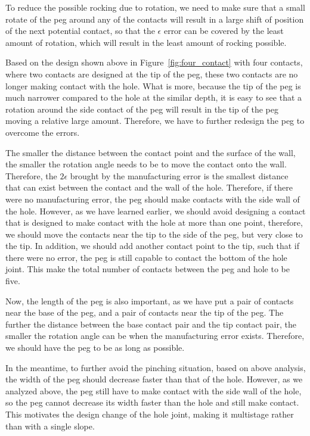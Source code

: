 \documentclass[11pt, twocolumn]{article}
\begin{document}
To reduce the possible rocking due to rotation, we need to make sure that a small rotate of the peg around any of the contacts will result in a large shift of position of the next potential contact, so that the $\epsilon$ error can be covered by the least amount of rotation, which will result in the least amount of rocking possible. 

Based on the design shown above in Figure~\ref{fig:four_contact} with four contacts, where two contacts are designed at the tip of the peg, these two contacts are no longer making contact with the hole. What is more, because the tip of the peg is much narrower compared to the hole at the similar depth, it is easy to see that a rotation around the side contact of the peg will result in the tip of the peg moving a relative large amount. Therefore, we have to further redesign the peg to overcome the errors. 


The smaller the distance between the contact point and the surface of the wall, the smaller the rotation angle needs to be to move the contact onto the wall. Therefore, the $2\epsilon$ brought by the manufacturing error is the smallest distance that can exist between the contact and the wall of the hole. Therefore, if there were no manufacturing error, the peg should make contacts with the side wall of the hole. However, as we have learned earlier, we should avoid designing a contact that is designed to make contact with the hole at more than one point, therefore, we should move the contacts near the tip to the side of the peg, but very close to the tip. In addition, we should add another contact point to the tip, such that if there were no error, the peg is still capable to contact the bottom of the hole joint. This make the total number of contacts between the peg and hole to be five. 

Now, the length of the peg is also important, as we have put a pair of contacts near the base of the peg, and a pair of contacts near the tip of the peg. The further the distance between the base contact pair and the tip contact pair, the smaller the rotation angle can be when the manufacturing error exists. Therefore, we should have the peg to be as long as possible. 

In the meantime, to further avoid the pinching situation, based on above analysis, the width of the peg should decrease faster than that of the hole. However, as we analyzed above, the peg still have to make contact with the side wall of the hole, so the peg cannot decrease its width faster than the hole and still make contact. This motivates the design change of the hole joint, making it multistage rather than with a single slope. 
\end{document}
